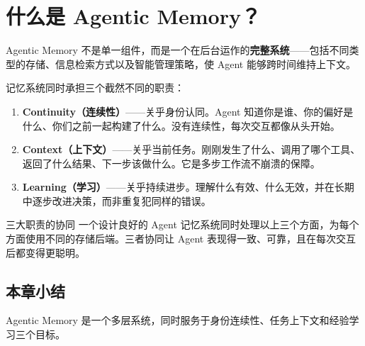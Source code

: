 \section{什么是 Agentic Memory？}

Agentic Memory 不是单一组件，而是一个在后台运作的\textbf{完整系统}——包括不同类型的存储、信息检索方式以及智能管理策略，使 Agent 能够跨时间维持上下文。

记忆系统同时承担三个截然不同的职责：

\begin{enumerate}[leftmargin=2em]
    \item \textbf{Continuity（连续性）}——关乎身份认同。Agent 知道你是谁、你的偏好是什么、你们之前一起构建了什么。没有连续性，每次交互都像从头开始。
    \item \textbf{Context（上下文）}——关乎当前任务。刚刚发生了什么、调用了哪个工具、返回了什么结果、下一步该做什么。它是多步工作流不崩溃的保障。
    \item \textbf{Learning（学习）}——关乎持续进步。理解什么有效、什么无效，并在长期中逐步改进决策，而非重复犯同样的错误。
\end{enumerate}

\begin{knowledgebox}{三大职责的协同}
一个设计良好的 Agent 记忆系统同时处理以上三个方面，为每个方面使用不同的存储后端。三者协同让 Agent 表现得一致、可靠，且在每次交互后都变得更聪明。
\end{knowledgebox}

\subsection{本章小结}

Agentic Memory 是一个多层系统，同时服务于身份连续性、任务上下文和经验学习三个目标。

